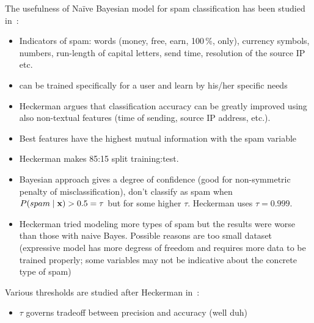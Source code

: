 \documentclass[english,cover]{fitthesis} %
\newcommand{\vars}[1]{{\bold{#1}}}         %
\begin{document}
\bigskip
The usefulness of Naïve Bayesian model for spam classification has been studied in~\cite{heckerman98_spam}:
\begin{itemize}
    \item Indicators of spam: words (money, free, earn, 100\,\%, only), currency symbols, numbers, run-length of capital letters, send time, resolution of the source IP etc.~\cite{heckerman98_spam}
    \item can be trained specifically for a user and learn by his/her specific needs
    \item Heckerman argues that classification accuracy can be greatly improved using also non-textual features (time of sending, source IP address, etc.).
    \item Best features have the highest mutual information with the spam variable
    \item Heckerman makes 85:15 split training:test.
    \item Bayesian approach gives a degree of confidence (good for non-symmetric penalty of misclassification), don't classify as spam when $P(spam \mid \vars{x}) > 0.5 = \tau$ but for some higher $\tau$. Heckerman uses $\tau = 0.999$.
    \item Heckerman tried modeling more types of spam but the results were worse than those with naive Bayes. Possible reasons are too small dataset (expressive model has more degress of freedom and requires more data to be trained properly; some variables may not be indicative about the concrete type of spam)
\end{itemize}

Various thresholds are studied after Heckerman in~\cite{androutsopoulos00_spam}:
\begin{itemize}
    \item $\tau$ governs tradeoff between precision and accuracy (well duh)
\end{itemize}
\end{document}
